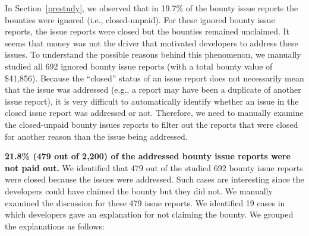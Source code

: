 
In Section~\ref{prestudy}, we observed that in 19.7\% of the bounty issue reports the bounties were ignored (i.e., closed-unpaid). For these ignored bounty issue reports, the issue reports were closed but the bounties remained unclaimed.
It seems that money was not the driver that motivated developers to address these issues.
To understand the possible reasons behind this phenomenon, we manually studied all 692 ignored bounty issue reports (with a total bounty value of \$41,856).
Because the ``closed'' status of an issue report does not necessarily mean that the issue was addressed (e.g., a report may have been a duplicate of another issue report), it is very difficult to automatically identify whether an issue in the closed issue report was addressed or not.
Therefore, we need to manually examine the closed-unpaid bounty issues reports to filter out the reports that were closed for another reason than the issue being addressed.




\textbf{21.8\% (479 out of 2,200) of the addressed bounty issue reports were not paid out.} We identified that 479 out of the studied 692 bounty issue reports were closed because the issues were addressed. Such cases are interesting since the developers could have claimed the bounty but they did not. We manually examined the discussion for these 479 issue reports. We identified 19 cases in which developers gave an explanation for not claiming the bounty. We grouped the explanations as follows:

